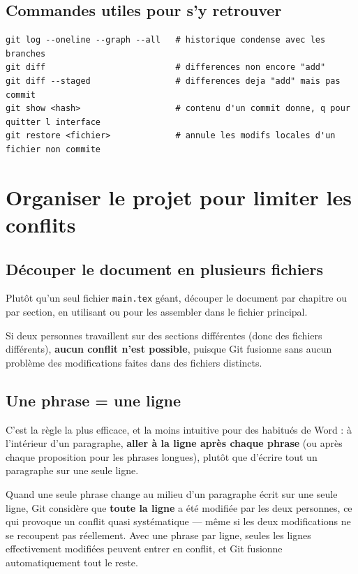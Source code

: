 \documentclass[11pt,a4paper]{article}
\begin{document}
\subsection*{Commandes utiles pour s'y retrouver}

\begin{lstlisting}[style=bashstyle]
git log --oneline --graph --all   # historique condense avec les branches
git diff                          # differences non encore "add"
git diff --staged                 # differences deja "add" mais pas commit
git show <hash>                   # contenu d'un commit donne, q pour quitter l interface
git restore <fichier>             # annule les modifs locales d'un fichier non commite
\end{lstlisting}

\section{Organiser le projet pour limiter les conflits}

\subsection{Découper le document en plusieurs fichiers}

Plutôt qu'un seul fichier \texttt{main.tex} géant, découper le document par chapitre ou par section, en utilisant \verb|| ou \verb|| pour les assembler dans le fichier principal.

Si deux personnes travaillent sur des sections différentes (donc des fichiers différents), \textbf{aucun conflit n'est possible}, puisque Git fusionne sans aucun problème des modifications faites dans des fichiers distincts.

\subsection{Une phrase = une ligne}

C'est la règle la plus efficace, et la moins intuitive pour des habitués de Word : à l'intérieur d'un paragraphe, \textbf{aller à la ligne après chaque phrase} (ou après chaque proposition pour les phrases longues), plutôt que d'écrire tout un paragraphe sur une seule ligne.

Quand une seule phrase change au milieu d'un paragraphe écrit sur une seule ligne, Git considère que \textbf{toute la ligne} a été modifiée par les deux personnes, ce qui provoque un conflit quasi systématique --- même si les deux modifications ne se recoupent pas réellement. Avec une phrase par ligne, seules les lignes effectivement modifiées peuvent entrer en conflit, et Git fusionne automatiquement tout le reste.
\end{document}
